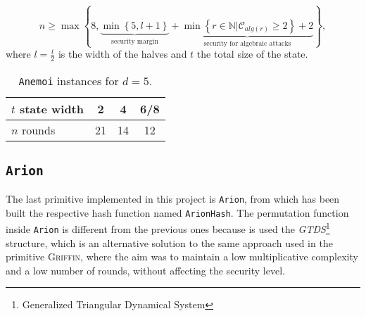 \documentclass[12pt, a4paper]{report}
\begin{document}
\begin{equation}
  n \ge \max \left\{ 8, \underbrace{\min \left\{ 5, l+1 \right\}}_{\text{security margin}} + \underbrace{\min \left\{ r \in \mathbb{N} | \mathcal{C}_{alg(r)} \ge 2 \right\} + 2}_{\text{security for algebraic attacks}} \right\}
  \label{eq:anemoirounds},
\end{equation}
where $l = \frac{t}{2}$ is the width of the halves and $t$ the total size of the state.

\begin{table}[H]
  \caption{\texttt{Anemoi} instances for $d = 5$.}\label{tab:aneomiinstances}
  \begin{center}
    \begin{tabular}{|l|c|c|c|}
      \hline
      $t$ state width & 2 & 4 & 6/8 \\
      \hline
      $n$ rounds & 21 & 14 & 12 \\
      \hline
    \end{tabular}
  \end{center}
\end{table}
\subsection{\texttt{Arion}}\label{subsec:arion}

The last primitive implemented in this project is \texttt{Arion}, from which has been built the respective hash function named \texttt{ArionHash}.
The permutation function inside \texttt{Arion} is different from the previous ones because is used the \textit{GTDS}\footnote{Generalized Triangular Dynamical System} structure\cite{gtds}, which is an alternative solution to the same approach used in the primitive \textsc{Griffin}, where the aim was to maintain a low multiplicative complexity and a low number of rounds, without affecting the security level.
\end{document}
